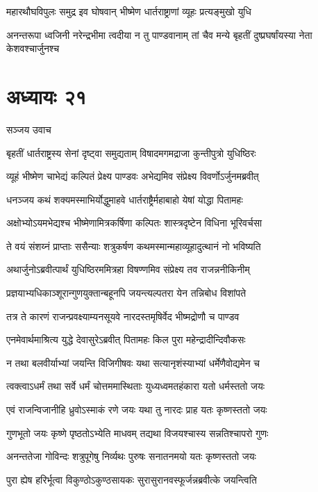 \twolineshloka
{महारथौघविपुलः समुद्र इव घोषवान्}
{भीष्मेण धार्तराष्ट्राणां व्यूहः प्रत्यङ्मुखो युधि}


\twolineshloka
{अनन्तरूपा ध्वजिनी नरेन्द्रभीमा त्वदीया न तु पाण्डवानाम्}
{तां चैव मन्ये बृहतीं दुष्प्रघर्षांयस्या नेता केशवश्चार्जुनश्च}


\chapter{अध्यायः २१}
\twolineshloka
{सञ्जय उवाच}
{}


\twolineshloka
{बृहतीं धार्तराष्ट्रस्य सेनां दृष्ट्वा समुद्यताम्}
{विषादमगमद्राजा कुन्तीपुत्रो युधिष्ठिरः}


\twolineshloka
{व्यूहं भीष्मेण चाभेद्यं कल्पितं प्रेक्ष्य पाण्डवः}
{अभेद्यमिव संप्रेक्ष्य विवर्णोऽर्जुनमब्रवीत्}


\twolineshloka
{धनञ्जय कथं शक्यमस्माभिर्योद्धुमाहवे}
{धार्तराष्ट्रैर्महाबाहो येषां योद्धा पितामहः}


\twolineshloka
{अक्षोभ्योऽयमभेद्यश्च भीष्मेणामित्रकर्षिणा}
{कल्पितः शास्त्रदृष्टेन विधिना भूरिवर्चसा}


\twolineshloka
{ते वयं संशय्नं प्राप्ताः ससैन्याः शत्रुकर्षण}
{कथमस्मान्महाव्यूहादुत्थानं नो भविष्यति}


\twolineshloka
{अथार्जुनोऽब्रवीत्पार्थं युधिष्ठिरममित्रहा}
{विषण्णमिव संप्रेक्ष्य तव राजन्ननीकिनीम्}


\twolineshloka
{प्रज्ञयाभ्यधिकाञ्शूरान्गुणयुक्तान्बहूनपि}
{जयन्त्यल्पतरा येन तन्निबोध विशांपते}


\twolineshloka
{तत्र ते कारणं राजन्प्रवक्ष्याम्यनसूयवे}
{नारदस्तमृषिर्वेद भीष्मद्रोणौ च पाण्डव}


\twolineshloka
{एनमेवार्थमाश्रित्य युद्धे देवासुरेऽब्रवीत्}
{पितामहः किल पुरा महेन्द्रादीन्दिवौकसः}


\twolineshloka
{न तथा बलवीर्याभ्यां जयन्ति विजिगीषवः}
{यथा सत्यानृशंस्याभ्यां धर्मेणैवोद्यमेन च}


\twolineshloka
{त्वक्त्वाऽधर्मं तथा सर्वे धर्मं चोत्तममास्थिताः}
{युध्यध्वमतहंकारा यतो धर्मस्ततो जयः}


\twolineshloka
{एवं राजन्विजानीहि ध्रुवोऽस्माकं रणे जयः}
{यथा तु नारदः प्राह यतः कृष्णस्ततो जयः}


\twolineshloka
{गुणभूतो जयः कृष्णे पृष्ठतोऽभ्येति माधवम्}
{तद्यथा विजयश्चास्य सन्नतिश्चापरो गुणः}


\twolineshloka
{अनन्ततेजा गोविन्दः शत्रुपूगेषु निर्व्यथः}
{पुरुषः सनातनमयो यतः कृष्णस्ततो जयः}


\twolineshloka
{पुरा ह्येष हरिर्भूत्वा विकुण्ठोऽकुण्ठसायकः}
{सुरासुरानवस्फूर्जन्नब्रवीत्के जयन्त्विति}


